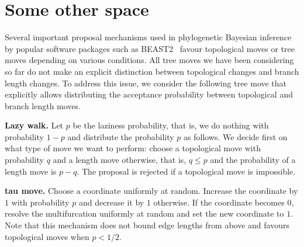 \documentclass{amsart}
\begin{document}
\section{Some other space}

Several important proposal mechanisms used in phylogenetic Bayesian inference by 
popular software packages such as BEAST2~\cite{beast2} favour topological moves
or tree moves depending on various conditions. All tree moves we have been 
considering so far do not make an explicit distinction between topological 
changes and branch length changes. To address this issue, we
consider the
following tree move that explicitly allows distributing the acceptance 
probability between topological and branch length moves. 

{\bf Lazy walk.} Let $p$ be the laziness probability, that is, we do nothing 
with probability $1-p$ and distribute the probability $p$ as follows. 
We decide first on what type of move we want to perform: choose a topological 
move with probability $q$ and a length move otherwise, that is, $q \leq p$
and the probability of a length move is $p-q$. The proposal is rejected if
a topological move is impossible. 

{\bf tau move.} Choose a coordinate uniformly at random. Increase the
coordinate by $1$ with probability $p$ and decrease it by $1$ otherwise.
If the coordinate becomes $0$, resolve the multifurcation uniformly at
random and set the new coordinate to $1$. Note that this mechanism 
does not bound edge lengths from above and favours topological moves when 
$p<1/2$. 



\end{document}
